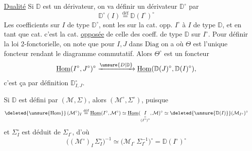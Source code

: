 \uline{Dualité} Si $\mathbb D$ est un dérivateur, on va définir un dérivateur  $\mathbb D^\circ$ par
\[
\mathbb D^\circ(I)\overset{\text{déf}}{=}\mathbb D(I^\circ)^\circ
\]
Les coefficients sur $I$  de type $\mathbb D^\circ$, sont les  sur la cat. opp. $I^\circ$ à $I$ de type $\mathbb D$, et en tant que cat. c'est la cat. \uline{opposée} de celle des coeff. de type $\mathbb D$ sur $I^\circ$. Pour définir la loi 2-fonctorielle, on note que pour $I,J$ dans $\mathrm{Diag}$ on a
où $\Theta$ est l'unique foncteur rendant le diagramme commutatif. Alors $\Theta^\circ$ est un foncteur
\[
\underline{\mathrm{Hom}}(I^\circ,J^\circ)^\circ\xrightarrow{\unsure{D|\mathbb D}}\underline{\mathrm{Hom}}(\mathbb D(J)^\circ,\mathbb D(I)^\circ),
\]
c'est ça par définition $\mathbb D^\circ_{I,J}$.

Si $\mathbb D$ est défini par $(\mathcal M,\Sigma)$, alors  $(\mathcal M^\circ,\Sigma^\circ)$, puisque
\[
\deleted{\unsure{\mathrm{Hom}}}\,(\mathcal M^\circ)_I\overset{\text{déf}}{=}
\underline{\mathrm{Hom}}(I^\circ,\mathcal M^\circ)\simeq
\underline{\mathrm{Hom}}(\underset{\substack{\shortparallel\\(I^\circ)^\circ}}{I},\mathcal M)^\circ
\simeq\deleted{\unsure{\mathbb D(I)}}(\mathcal M_{I^\circ})^\circ
\]
et $\Sigma^\circ_I$ est déduit de $\Sigma_{I^\circ}$,  d'où
\[
\big((\mathcal M^\circ)_I\,\Sigma^\circ_I\big)^{-1}\simeq
\big(\mathcal M_{I^\circ}\,\Sigma_{I^\circ}^{-1}\big)^\circ=\mathbb D(I^\circ)^\circ
\]
